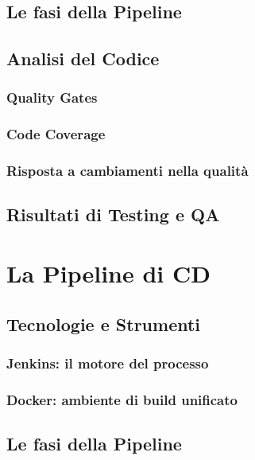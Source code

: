 \documentclass[a4paper,12pt]{report}
\begin{document}
	\section{Le fasi della Pipeline}
	
	\section{Analisi del Codice}
	
	\subsection{Quality Gates}
	
	\subsection{Code Coverage}
	
	\subsection{Risposta a cambiamenti nella qualità}
	
	\section{Risultati di Testing e QA}
	
	\chapter{La Pipeline di CD}
	
	\section{Tecnologie e Strumenti}
	
	\subsection{Jenkins: il motore del processo}
	
	\subsection{Docker: ambiente di build unificato}
	
	\section{Le fasi della Pipeline}
	
\end{document}
